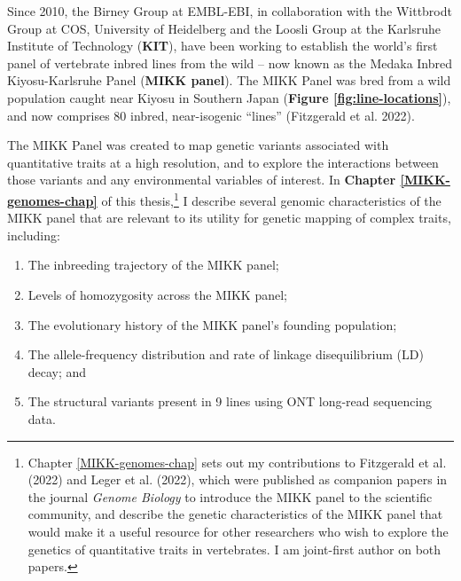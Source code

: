 \documentclass[
]{book}
\begin{document}
Since 2010, the Birney Group at EMBL-EBI, in collaboration with the Wittbrodt Group at COS, University of Heidelberg and the Loosli Group at the Karlsruhe Institute of Technology (\textbf{KIT}), have been working to establish the world's first panel of vertebrate inbred lines from the wild -- now known as the Medaka Inbred Kiyosu-Karlsruhe Panel (\textbf{MIKK panel}). The MIKK Panel was bred from a wild population caught near Kiyosu in Southern Japan (\textbf{Figure \ref{fig:line-locations}}), and now comprises 80 inbred, near-isogenic ``lines'' (Fitzgerald et al. 2022).

The MIKK Panel was created to map genetic variants associated with quantitative traits at a high resolution, and to explore the interactions between those variants and any environmental variables of interest. In \textbf{Chapter \ref{MIKK-genomes-chap}} of this thesis,\footnote{Chapter \ref{MIKK-genomes-chap} sets out my contributions to Fitzgerald et al. (2022) and Leger et al. (2022), which were published as companion papers in the journal \emph{Genome Biology} to introduce the MIKK panel to the scientific community, and describe the genetic characteristics of the MIKK panel that would make it a useful resource for other researchers who wish to explore the genetics of quantitative traits in vertebrates. I am joint-first author on both papers.} I describe several genomic characteristics of the MIKK panel that are relevant to its utility for genetic mapping of complex traits, including:

\begin{enumerate}
\def\labelenumi{\arabic{enumi}.}
\item
  The inbreeding trajectory of the MIKK panel;
\item
  Levels of homozygosity across the MIKK panel;
\item
  The evolutionary history of the MIKK panel's founding population;
\item
  The allele-frequency distribution and rate of linkage disequilibrium (LD) decay; and
\item
  The structural variants present in 9 lines using ONT long-read sequencing data.
\end{enumerate}
\end{document}
